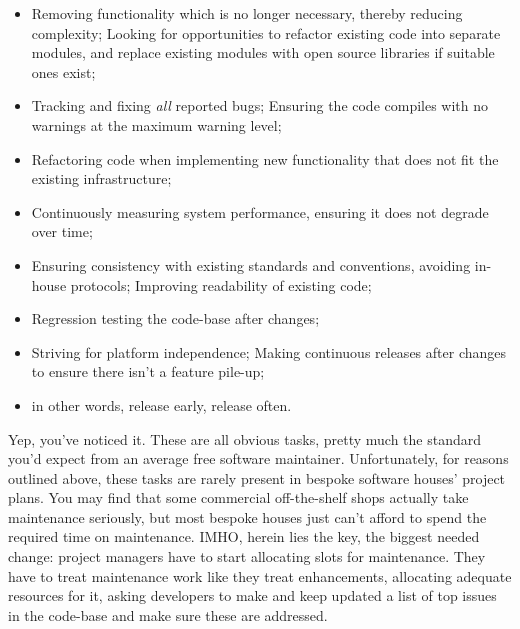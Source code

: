 \documentclass{memoir}
\begin{document}
\begin{itemize}
\item Removing functionality which is no longer necessary, thereby
  reducing complexity; Looking for opportunities to refactor existing
  code into separate modules, and replace existing modules with open
  source libraries if suitable ones exist;
\item Tracking and fixing \emph{all} reported bugs; Ensuring the code
  compiles with no warnings at the maximum warning level;
\item Refactoring code when implementing new functionality that does
  not fit the existing infrastructure;
\item Continuously measuring system performance, ensuring it does not
  degrade over time;
\item Ensuring consistency with existing standards and conventions,
  avoiding in-house protocols; Improving readability of existing code;
\item Regression testing the code-base after changes;
\item Striving for platform independence; Making continuous releases
  after changes to ensure there isn't a feature pile-up;
\item in other words, release early, release often.
\end{itemize}

Yep, you've noticed it. These are all obvious tasks, pretty much the
standard you'd expect from an average free software
maintainer. Unfortunately, for reasons outlined above, these tasks are
rarely present in bespoke software houses' project plans. You may find
that some commercial off-the-shelf shops actually take maintenance
seriously, but most bespoke houses just can't afford to spend the
required time on maintenance. IMHO, herein lies the key, the biggest
needed change: project managers have to start allocating slots for
maintenance. They have to treat maintenance work like they treat
enhancements, allocating adequate resources for it, asking developers
to make and keep updated a list of top issues in the code-base and
make sure these are addressed.
\end{document}
